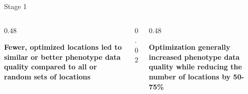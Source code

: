 \documentclass[final]{beamer}
\newlength{\twocolwid}
\begin{document}
\begin{frame}[t]
\begin{columns}[t]
\begin{column}{\twocolwid}
\begin{block}{Stage 1}
\begin{columns}[t,totalwidth=\twocolwid]
\end{columns}

\vspace{4cm}





\begin{columns}[t,totalwidth=\twocolwid] %

\begin{column}{0.48\twocolwid}



\textbf{Fewer, optimized locations led to similar or better phenotype data quality compared to all or random sets of locations}

\vspace{0.5cm}




\end{column}

\begin{column}{0.02\twocolwid}
\end{column}


\begin{column}{0.48\twocolwid}



\vspace{1cm}




\vspace{1cm}

\textbf{Optimization generally increased phenotype data quality while reducing the number of locations by 50-75\%}


\vspace{1cm}



\end{column}
\end{columns}
\end{block}
\end{column}
\end{columns}
\end{frame}
\end{document}
